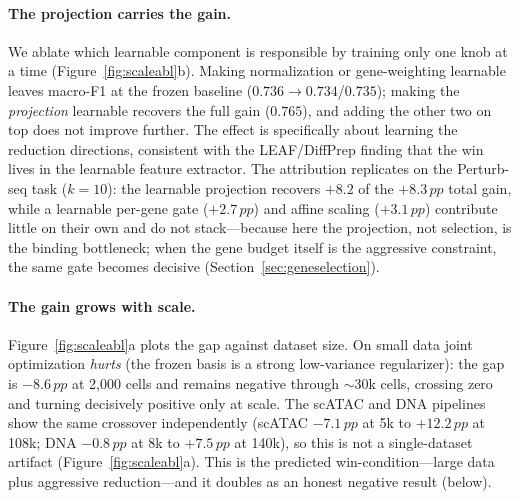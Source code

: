 \documentclass[10pt,twocolumn]{article}
\newcommand{\pp}{\,pp}
\begin{document}
\paragraph{The projection carries the gain.} We ablate which learnable component is
responsible by training only one knob at a time (Figure~\ref{fig:scaleabl}b). Making
normalization or gene-weighting learnable leaves macro-F1 at the frozen baseline
($0.736 \!\to\! 0.734$/$0.735$); making the \emph{projection} learnable recovers the full
gain ($0.765$), and adding the other two on top does not improve further. The effect is
specifically about learning the reduction directions, consistent with the LEAF/DiffPrep
finding that the win lives in the learnable feature extractor. The attribution replicates on
the Perturb-seq task ($k{=}10$): the learnable projection recovers $+8.2$ of the $+8.3\pp$
total gain, while a learnable per-gene gate ($+2.7\pp$) and affine scaling ($+3.1\pp$)
contribute little on their own and do not stack---because here the projection, not selection,
is the binding bottleneck; when the gene budget itself is the aggressive constraint, the same
gate becomes decisive (Section~\ref{sec:geneselection}).

\paragraph{The gain grows with scale.} Figure~\ref{fig:scaleabl}a plots the gap against
dataset size. On small data joint optimization \emph{hurts} (the frozen basis is a strong
low-variance regularizer): the gap is $-8.6\pp$ at 2{,}000 cells and remains negative
through $\sim$30k cells, crossing zero and turning decisively positive only at scale. The
scATAC and DNA pipelines show the same crossover independently (scATAC $-7.1\pp$ at 5k to
$+12.2\pp$ at 108k; DNA $-0.8\pp$ at 8k to $+7.5\pp$ at 140k), so this is not a single-dataset
artifact (Figure~\ref{fig:scaleabl}a).
This is the predicted win-condition---large data plus aggressive reduction---and it doubles
as an honest negative result (below).
\end{document}
